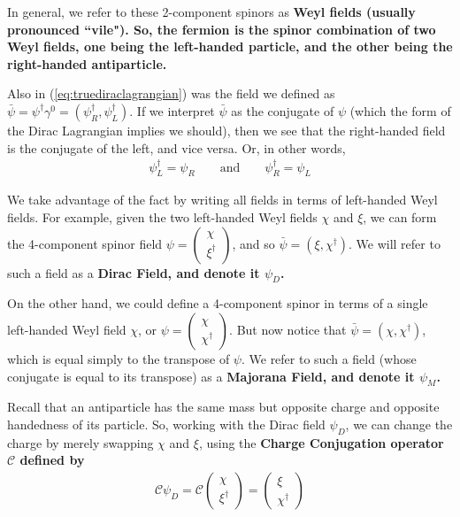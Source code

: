 \documentclass[12pt,epsf]{article}
\def\nolabel{\nonumber }
\def\nolabel{\nonumber }
\begin{document}
In general, we refer to these 2-component spinors as \bf Weyl \rm
fields (usually pronounced ``vile").  So, the fermion is the spinor
combination of two Weyl fields, one being the left-handed particle, and
the other being the right-handed antiparticle.	

Also in (\ref{eq:truediraclagrangian}) was the field we defined as
$\bar \psi = \psi^{\dagger} \gamma^0 =
(\psi^{\dagger}_R,\psi^{\dagger}_L)$.  If we interpret $\bar \psi$ as
the conjugate of $\psi$ (which the form of the Dirac Lagrangian implies
we should), then we see that the right-handed field is the conjugate of
the left, and vice versa.  Or, in other words,
\begin{eqnarray}
\psi^{\dagger}_L = \psi_R \qquad \mbox{and} \qquad \psi^{\dagger}_R =
\psi_L\nolabel
\end{eqnarray}

We take advantage of the fact by writing all fields in terms of left-handed
Weyl fields.  For example, given the two left-handed Weyl fields
$\chi$ and $\xi$, we can form the 4-component spinor field $\psi = 
\begin{pmatrix}
\chi \\ \xi^{\dagger}
\end{pmatrix}$, and so $\bar \psi = (\xi, \chi^{\dagger})$.  We will
refer to such a field as a \bf Dirac Field\rm, and denote it $\psi_D$.  

On the other hand, we could define a 4-component spinor in terms of a
single left-handed Weyl field $\chi$, or $\psi = 
\begin{pmatrix}
\chi \\ \chi^{\dagger}
\end{pmatrix}$.  But now notice that $\bar \psi =
(\chi,\chi^{\dagger})$, which is equal simply to the transpose of
$\psi$.  We refer to such a field (whose conjugate is equal to its
transpose) as a \bf Majorana Field\rm, and denote it $\psi_M$.	

Recall that an antiparticle has the same mass but opposite charge and
opposite handedness of its particle.  So, working with the Dirac field
$\psi_D$, we can change the charge by merely swapping $\chi$ and $\xi$,
using the \bf Charge Conjugation \rm operator $\mathcal{C}$ defined by 
\begin{eqnarray}
\mathcal{C}\psi_D = \mathcal{C}
\begin{pmatrix}
\chi \\ \xi^{\dagger}
\end{pmatrix} = 
\begin{pmatrix}
\xi \\ \chi^{\dagger}
\end{pmatrix}\nolabel
\end{eqnarray}
\end{document}
